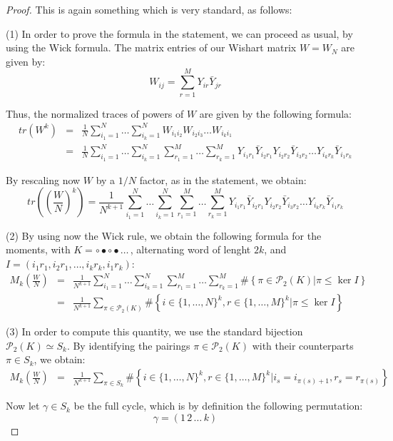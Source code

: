 \documentclass[12pt]{amsbook}
\begin{document}
\begin{proof}
This is again something which is very standard, as follows:

\medskip

(1) In order to prove the formula in the statement, we can proceed as usual, by using the Wick formula. The matrix entries of our Wishart matrix $W=W_N$ are given by:
$$W_{ij}=\sum_{r=1}^MY_{ir}\bar{Y}_{jr}$$

Thus, the normalized traces of powers of $W$ are given by the following formula:
\begin{eqnarray*}
tr(W^k)
&=&\frac{1}{N}\sum_{i_1=1}^N\ldots\sum_{i_k=1}^NW_{i_1i_2}W_{i_2i_3}\ldots W_{i_ki_1}\\
&=&\frac{1}{N}\sum_{i_1=1}^N\ldots\sum_{i_k=1}^N\sum_{r_1=1}^M\ldots\sum_{r_k=1}^MY_{i_1r_1}\bar{Y}_{i_2r_1}Y_{i_2r_2}\bar{Y}_{i_3r_2}\ldots Y_{i_kr_k}\bar{Y}_{i_1r_k}
\end{eqnarray*}

By rescaling now $W$ by a $1/N$ factor, as in the statement, we obtain:
$$tr\left(\left(\frac{W}{N}\right)^k\right)=\frac{1}{N^{k+1}}\sum_{i_1=1}^N\ldots\sum_{i_k=1}^N\sum_{r_1=1}^M\ldots\sum_{r_k=1}^MY_{i_1r_1}\bar{Y}_{i_2r_1}Y_{i_2r_2}\bar{Y}_{i_3r_2}\ldots Y_{i_kr_k}\bar{Y}_{i_1r_k}$$

(2) By using now the Wick rule, we obtain the following formula for the moments, with $K=\circ\bullet\circ\bullet\ldots\,$, alternating word of lenght $2k$, and $I=(i_1r_1,i_2r_1,\ldots,i_kr_k,i_1r_k)$:
\begin{eqnarray*}
M_k\left(\frac{W}{N}\right)
&=&\frac{1}{N^{k+1}}\sum_{i_1=1}^N\ldots\sum_{i_k=1}^N\sum_{r_1=1}^M\ldots\sum_{r_k=1}^M\#\left\{\pi\in\mathcal P_2(K)\Big|\pi\leq\ker I\right\}\\
&=&\frac{1}{N^{k+1}}\sum_{\pi\in\mathcal P_2(K)}\#\left\{i\in\{1,\ldots,N\}^k,r\in\{1,\ldots,M\}^k\Big|\pi\leq\ker I\right\}
\end{eqnarray*}

(3) In order to compute this quantity, we use the standard bijection $\mathcal P_2(K)\simeq S_k$. By identifying the pairings $\pi\in\mathcal P_2(K)$ with their counterparts $\pi\in S_k$, we obtain:
\begin{eqnarray*}
M_k\left(\frac{W}{N}\right)
&=&\frac{1}{N^{k+1}}\sum_{\pi\in S_k}\#\left\{i\in\{1,\ldots,N\}^k,r\in\{1,\ldots,M\}^k\Big|i_s=i_{\pi(s)+1},r_s=r_{\pi(s)}\right\}
\end{eqnarray*}

Now let $\gamma\in S_k$ be the full cycle, which is by definition the following permutation:
$$\gamma=(1 \, 2 \, \ldots \, k)$$


\end{proof}
\end{document}

